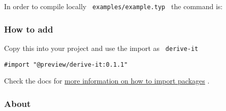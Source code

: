 In order to compile locally \texttt{\ examples/example.typ\ } the
command is:

\begin{Shaded}
\begin{Highlighting}[]
\end{Highlighting}
\end{Shaded}

\subsubsection{How to add}\label{how-to-add}

Copy this into your project and use the import as \texttt{\ derive-it\ }

\begin{verbatim}
#import "@preview/derive-it:0.1.1"
\end{verbatim}



Check the docs for
\href{https://typst.app/docs/reference/scripting/\#packages}{more
information on how to import packages} .

\subsubsection{About}\label{about}

